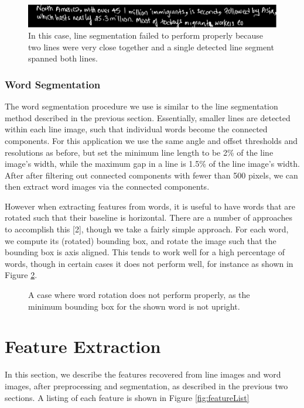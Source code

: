 \documentclass[paper=a4, fontsize=11pt]{scrartcl} %
\numberwithin{equation}{section} %
\numberwithin{figure}{section} %
\numberwithin{table}{section} %
\begin{document}
\begin{figure}
\includegraphics{linefail.png}
\caption{In this case, line segmentation failed to perform properly because two lines were very close together and a single detected line segment spanned both lines.}
\label{fig:linefail}
\end{figure}

\subsubsection{Word Segmentation}
The word segmentation procedure we use is similar to the line
segmentation method described in the previous section. Essentially,
smaller lines are detected within each line image, such that
individual words become the connected components. For this application
we use the same angle and offset thresholds and resolutions as before,
but set the minimum line length to be 2\% of the line image's width,
while the maximum gap in a line is 1.5\% of the line image's
width. After after filtering out connected components with fewer than
500 pixels, we can then extract word images via the connected
components.

However when extracting features from words, it is useful to have
words that are rotated such that their baseline is horizontal. There
are a number of approaches to accomplish this [2], though we take a
fairly simple approach. For each word, we compute its (rotated)
bounding box, and rotate the image such that the bounding box is axis
aligned. This tends to work well for a high percentage of words,
though in certain cases it does not perform well, for instance as
shown in Figure \ref{fig:failwordsegment}.
\begin{figure}
  \label{fig:failwordsegment}
  \caption{A case where word rotation does not perform properly, as
    the minimum bounding box for the shown word is not upright.}
\end{figure}


\section{Feature Extraction}
\label{sec:feature}
In this section, we describe the features recovered from line images
and word images, after preprocessing and segmentation, as described in
the previous two sections. A listing of each feature is shown in
Figure \ref{fig:featureList}
\end{document}
